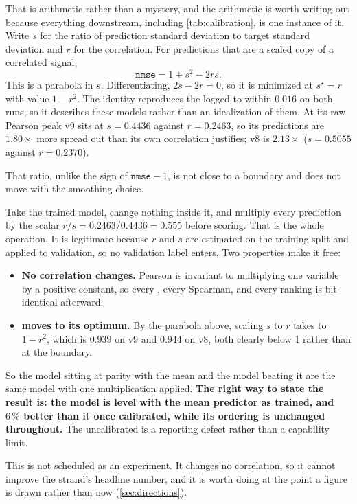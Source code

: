 That is arithmetic rather than a mystery, and the arithmetic is worth writing out because
everything downstream, including \cref{tab:calibration}, is one instance of it. Write $s$
for the ratio of prediction standard deviation to target standard deviation and $r$ for
the correlation. For predictions that are a scaled copy of a correlated signal,
$$\texttt{nmse} = 1 + s^2 - 2rs.$$
This is a parabola in $s$. Differentiating, $2s - 2r = 0$, so it is minimized at
$s^\star = r$ with value $1 - r^2$. The identity reproduces the logged  to
within $0.016$ on both runs, so it describes these models rather than an idealization of
them. At its raw Pearson peak v9 sits at $s = 0.4436$ against $r = 0.2463$, so its
predictions are $\mathbf{1.80\times}$ more spread out than its own correlation justifies;
v8 is $2.13\times$ ($s = 0.5055$ against $r = 0.2370$).

That ratio, unlike the sign of $\texttt{nmse} - 1$, is not close to a boundary and does not
move with the smoothing choice.

 Take the trained model, change nothing
inside it, and multiply every prediction by the scalar $r/s = 0.2463/0.4436 = 0.555$ before
scoring. That is the whole operation. It is legitimate because $r$ and $s$ are estimated on
the training split and applied to validation, so no validation label enters. Two properties
make it free:

\begin{itemize}
\item \textbf{No correlation changes.} Pearson is invariant to multiplying one variable by
  a positive constant, so every , every Spearman, and every
  ranking is bit-identical afterward.
\item \textbf{ moves to its optimum.} By the parabola above, scaling $s$ to $r$
  takes  to $1 - r^2$, which is $0.939$ on v9 and $0.944$ on v8, both clearly
  below 1 rather than at the boundary.
\end{itemize}

So the model sitting at parity with the mean and the model beating it are the same model
with one multiplication applied. \textbf{The right way to state the result is: the model is
level with the mean predictor as trained, and $6\,\%$ better than it once calibrated, while
its ordering is unchanged throughout.} The uncalibrated  is a reporting defect
rather than a capability limit.

This is not scheduled as an experiment. It changes no correlation, so it cannot improve the
strand's headline number, and it is worth doing at the point a figure is drawn rather than
now (\cref{sec:directions}).

